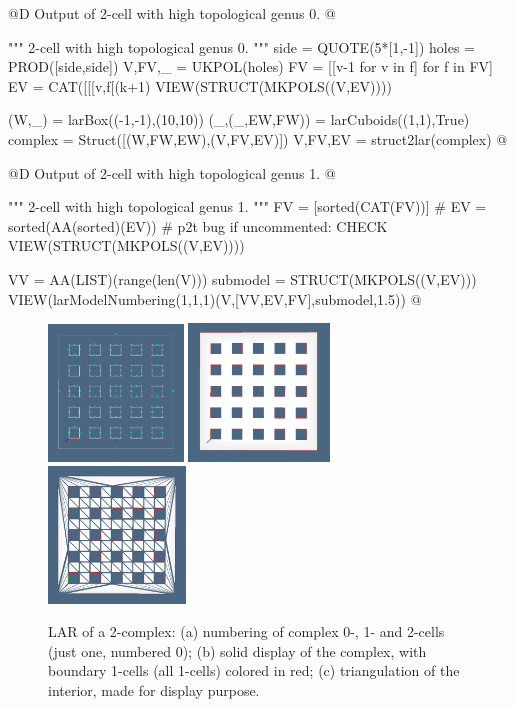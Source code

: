 \documentclass[11pt,oneside]{article}    %
\begin{document}
@D Output of 2-cell with high topological genus 0.
@{""" 2-cell with high topological genus 0. """
side = QUOTE(5*[1,-1])
holes = PROD([side,side])
V,FV,_ = UKPOL(holes)
FV = [[v-1 for v in f] for f in FV]
EV = CAT([[[v,f[(k+1)%
VIEW(STRUCT(MKPOLS((V,EV))))

(W,_) = larBox((-1,-1),(10,10))
(_,(_,EW,FW)) = larCuboids((1,1),True)
complex = Struct([(W,FW,EW),(V,FV,EV)])
V,FV,EV = struct2lar(complex)
@}

@D Output of 2-cell with high topological genus 1.
@{""" 2-cell with high topological genus 1. """
FV = [sorted(CAT(FV))] 
# EV = sorted(AA(sorted)(EV))  # p2t bug if uncommented: CHECK
VIEW(STRUCT(MKPOLS((V,EV))))

VV = AA(LIST)(range(len(V)))
submodel = STRUCT(MKPOLS((V,EV)))
VIEW(larModelNumbering(1,1,1)(V,[VV,EV,FV],submodel,1.5)) 
@}


\begin{figure}[htbp] %
   \centering
   \includegraphics[width=0.32\textwidth]{images/squareholes1} 
   \includegraphics[width=0.335\textwidth]{images/squareholes2} 
   \includegraphics[width=0.325\textwidth]{images/squareholes3} 
   \caption{LAR of a 2-complex: (a) numbering of complex 0-, 1- and 2-cells (just one, numbered 0); (b) solid display of the complex, with boundary 1-cells (all 1-cells) colored in red; (c) triangulation of the interior, made for display purpose.}
   \label{fig:squareholes}
\end{figure}
\end{document}
